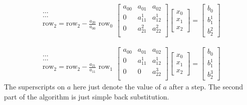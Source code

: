 \documentclass[10pt,letterpaper,notitlepage]{article}
\newcommand{\beq}{\begin{equation*} \begin{aligned}}
\newcommand{\eeq}{\end{aligned}\end{equation*}}
\begin{document}
\beq
\begin{matrix}
	\dots\\
	\dots\\
	\text{row}_2 = \text{row}_2 - \frac{a_{20}}{a_{00}} \text{ row}_0
\end{matrix}
\begin{bmatrix}
	a_{00} & a_{01} & a_{02} \\
	0    & a_{11}^1 & a_{12}^1 \\
    0     & a_{21}^2 & a_{22}^2 \\
\end{bmatrix}
\begin{bmatrix}
	x_0 \\ x_1 \\ x_2
\end{bmatrix}
=
\begin{bmatrix}
	b_0 \\ b_1^1 \\ b_2^2
\end{bmatrix}
\eeq  

\beq
\begin{matrix}
	\dots\\
	\dots\\
	\text{row}_2 = \text{row}_2 - \frac{a_{21}}{a_{11}} \text{ row}_1
\end{matrix}
\begin{bmatrix}
	a_{00} & a_{01} & a_{02} \\
	0    & a_{11}^1 & a_{12}^1 \\
	0     & 0            & a_{22}^3 \\
\end{bmatrix}
\begin{bmatrix}
	x_0 \\ x_1 \\ x_2
\end{bmatrix}
=
\begin{bmatrix}
	b_0 \\ b_1^1 \\ b_2^3
\end{bmatrix}
\eeq  
\newline
\newline
The superscripts on $a$ here just denote the value of $a$ after a step. The second part of the algorithm is just simple back substitution.
\end{document}

